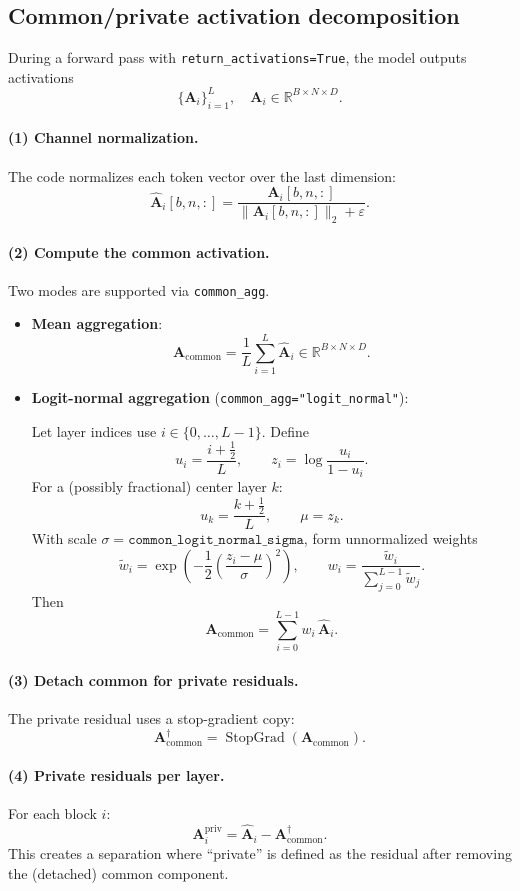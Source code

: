 \documentclass[11pt]{article}
\newcommand{\StopGrad}{\operatorname{StopGrad}}
\begin{document}
\subsection*{Common/private activation decomposition}
During a forward pass with \texttt{return\_activations=True}, the model outputs activations
\[
  \{\bm{A}_i\}_{i=1}^L,\quad \bm{A}_i\in\mathbb{R}^{B\times N\times D}.
\]
\paragraph{(1) Channel normalization.}
The code normalizes each token vector over the last dimension:
\[
  \hat{\bm{A}}_i[b,n,:] = \frac{\bm{A}_i[b,n,:]}{\|\bm{A}_i[b,n,:]\|_2+\varepsilon}.
\]
\paragraph{(2) Compute the common activation.}
Two modes are supported via \texttt{common\_agg}.
\begin{itemize}
  \item \textbf{Mean aggregation}:
  \[
    \bm{A}_{\text{common}}=\frac{1}{L}\sum_{i=1}^L \hat{\bm{A}}_i \in \mathbb{R}^{B\times N\times D}.
  \]

  \item \textbf{Logit-normal aggregation} (\texttt{common\_agg="logit\_normal"}):
  
  Let layer indices use $i\in\{0,\dots,L-1\}$. Define
  \[
    u_i=\frac{i+\tfrac{1}{2}}{L},\qquad
    z_i=\log\frac{u_i}{1-u_i}.
  \]
  For a (possibly fractional) center layer $k$:
  \[
    u_k=\frac{k+\tfrac{1}{2}}{L},\qquad
    \mu=z_k.
  \]
  With scale $\sigma=\texttt{common\_logit\_normal\_sigma}$, form unnormalized weights
  \[
    \tilde{w}_i=\exp\left(-\frac{1}{2}\left(\frac{z_i-\mu}{\sigma}\right)^2\right),
    \qquad
    w_i=\frac{\tilde{w}_i}{\sum_{j=0}^{L-1}\tilde{w}_j}.
  \]
  Then
  \[
    \bm{A}_{\text{common}}=\sum_{i=0}^{L-1} w_i\,\hat{\bm{A}}_i.
  \]
  \end{itemize}
\paragraph{(3) Detach common for private residuals.}
The private residual uses a stop-gradient copy:
\[
  \bm{A}_{\text{common}}^{\dagger}=\StopGrad(\bm{A}_{\text{common}}).
\]
\paragraph{(4) Private residuals per layer.}
For each block $i$:
\[
  \bm{A}_i^{\text{priv}}=\hat{\bm{A}}_i-\bm{A}_{\text{common}}^{\dagger}.
\]
This creates a separation where ``private'' is defined as the residual after removing the (detached) common component.
\end{document}
